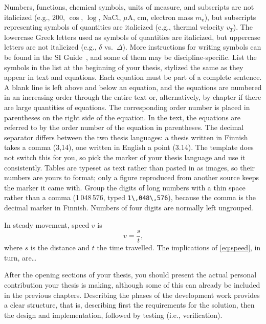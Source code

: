 Numbers, functions, chemical symbols, units of measure, and subscripts are not italicized (e.g., 200, $\cos$, $\log$, NaCl, $\mu$A, cm, electron mass $m_\mathrm{e}$), but subscripts representing symbols of quantities are italicized (e.g., thermal velocity $v_\mathit{T}$). The lowercase Greek letters used as symbols of quantities are italicized, but uppercase letters are not italicized (e.g., $\delta$ vs.\ $\Delta$). More instructions for writing symbols can be found in the SI Guide~\cite{SIguide}, and some of them may be discipline-specific.
List the symbols in the list at the beginning of your thesis, stylized the same as they appear in text and equations. Each equation must be part of a complete sentence. A blank line is left above and below an equation, and the equations are numbered in an increasing order through the entire text or, alternatively, by chapter if there are large quantities of equations. The corresponding order number is placed in parentheses on the right side of the equation. In the text, the equations are referred to by the order number of the equation in parentheses.
The decimal separator differs between the two thesis languages: a thesis written in Finnish takes a comma (3,14), one written in English a point (3.14). The template does not switch this for you, so pick the marker of your thesis language and use it consistently. Tables are typeset as text rather than pasted in as images, so their numbers are yours to format; only a figure reproduced from another source keeps the marker it came with. Group the digits of long numbers with a thin space rather than a comma (1\,048\,576, typed \verb|1\,048\,576|), because the comma is the decimal marker in Finnish. Numbers of four digits are normally left ungrouped.

In steady movement, speed $v$ is
\begin{equation}
    v = \frac{s}{t}\text{,}
    \label{eq:speed}
\end{equation}
where $s$ is the distance and $t$ the time travelled. The implications of \eqref{eq:speed}, in turn, are\ldots

After the opening sections of your thesis, you should present the actual personal contribution your thesis is making, although some of this can already be included in the previous chapters. Describing the phases of the development work provides a clear structure, that is, describing first the requirements for the solution, then the design and implementation, followed by testing (i.e., verification).

